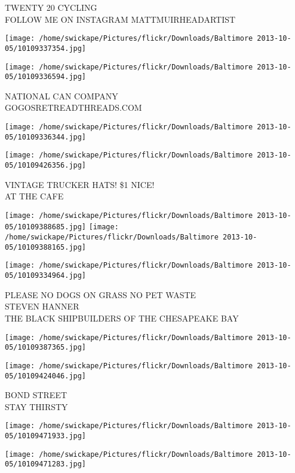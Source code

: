 \documentclass[10pt,letterpaper]{article}
\begin{document}
TWENTY 20 CYCLING\\
FOLLOW ME ON INSTAGRAM MATTMUIRHEADARTIST
\pagebreak

\texttt{[image: /home/swickape/Pictures/flickr/Downloads/Baltimore 2013-10-05/10109337354.jpg]}

\vspace{0.25in}
\texttt{[image: /home/swickape/Pictures/flickr/Downloads/Baltimore 2013-10-05/10109336594.jpg]}

NATIONAL CAN COMPANY\\
GOGOSRETREADTHREADS.COM
\pagebreak

\texttt{[image: /home/swickape/Pictures/flickr/Downloads/Baltimore 2013-10-05/10109336344.jpg]}

\vspace{0.25in}
\texttt{[image: /home/swickape/Pictures/flickr/Downloads/Baltimore 2013-10-05/10109426356.jpg]}

VINTAGE TRUCKER HATS! \$1 NICE!\\
AT THE CAFE
\pagebreak

\texttt{[image: /home/swickape/Pictures/flickr/Downloads/Baltimore 2013-10-05/10109388685.jpg]}
\texttt{[image: /home/swickape/Pictures/flickr/Downloads/Baltimore 2013-10-05/10109388165.jpg]}

\vspace{0.25in}
\texttt{[image: /home/swickape/Pictures/flickr/Downloads/Baltimore 2013-10-05/10109334964.jpg]}

PLEASE NO DOGS ON GRASS NO PET WASTE\\
STEVEN HANNER\\
THE BLACK SHIPBUILDERS OF THE CHESAPEAKE BAY
\pagebreak

\texttt{[image: /home/swickape/Pictures/flickr/Downloads/Baltimore 2013-10-05/10109387365.jpg]}

\vspace{0.25in}
\texttt{[image: /home/swickape/Pictures/flickr/Downloads/Baltimore 2013-10-05/10109424046.jpg]}

BOND STREET\\
STAY THIRSTY
\pagebreak

\texttt{[image: /home/swickape/Pictures/flickr/Downloads/Baltimore 2013-10-05/10109471933.jpg]}

\vspace{0.25in}
\texttt{[image: /home/swickape/Pictures/flickr/Downloads/Baltimore 2013-10-05/10109471283.jpg]}
\end{document}
